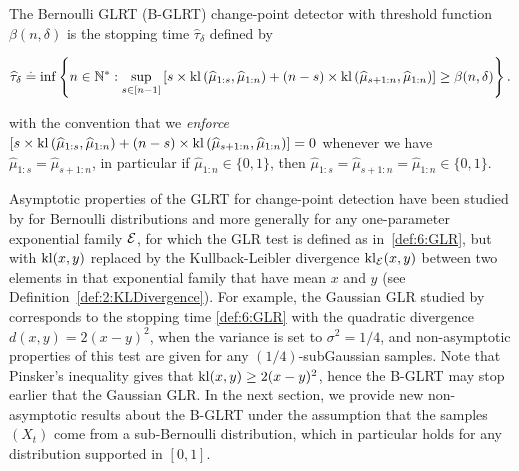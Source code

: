 \begin{definition}\label{def:6:GLRDef}
\begin{leftbar}[defnbar]  %
    The Bernoulli GLRT (B-GLRT) change-point detector with threshold function $\beta(n,\delta)$ is the stopping time $\widehat{\tau}_{\delta}$ defined by
    \begin{small}
        \begin{equation}\label{def:6:GLR}
            \widehat{\tau}_{\delta} \overset{.}{=} \inf \left\{ n \in \mathbb{N}^* : \sup_{s \in [n-1]} \left[s \times \mathrm{kl}\left(\widehat{\mu}_{1:s},\widehat{\mu}_{1:n}\right) + (n-s) \times \mathrm{kl}\left(\widehat{\mu}_{s+1:n},\widehat{\mu}_{1:n}\right)\right] \geq \beta(n,\delta)\right\}.
        \end{equation}
    \end{small}
    with the convention that we \emph{enforce} $\left[s \times \mathrm{kl}\left(\widehat{\mu}_{1:s},\widehat{\mu}_{1:n}\right) + (n-s) \times \mathrm{kl}\left(\widehat{\mu}_{s+1:n},\widehat{\mu}_{1:n}\right)\right] = 0$
    whenever we have $\widehat{\mu}_{1:s} = \widehat{\mu}_{s+1:n}$,
    in particular if $\widehat{\mu}_{1:n} \in \{0,1\}$, then $\widehat{\mu}_{1:s} = \widehat{\mu}_{s+1:n} = \widehat{\mu}_{1:n} \in \{0,1\}$.
\end{leftbar}  %
\end{definition}

Asymptotic properties of the GLRT for change-point detection have been studied by \cite{LaiXing10} for Bernoulli distributions and more generally for any one-parameter exponential family $\mathcal{E}$, for which the GLR test is defined as in~\eqref{def:6:GLR}, but with $\mathrm{kl}(x,y)$ replaced by the Kullback-Leibler divergence $\mathrm{kl}_{\mathcal{E}}(x,y)$ between two elements in that exponential family that have mean $x$ and $y$ (see Definition~\ref{def:2:KLDivergence}).
For example, the Gaussian GLR studied by \cite{Maillard2018GLR} corresponds to the stopping time \eqref{def:6:GLR} with the quadratic divergence $d(x,y) = 2(x-y)^2$, when the variance is set to $\sigma^2=1/4$, and non-asymptotic properties of this test are given for any $(1/4)$-subGaussian samples.
Note that Pinsker's inequality gives that $\mathrm{kl}(x,y) \geq 2(x-y)^2$, hence the B-GLRT may stop earlier that the Gaussian GLR.
%
In the next section, we provide new non-asymptotic results about the B-GLRT under the assumption that the samples $(X_t)$ come from a sub-Bernoulli distribution, which in particular holds for any distribution supported in $[0,1]$.


